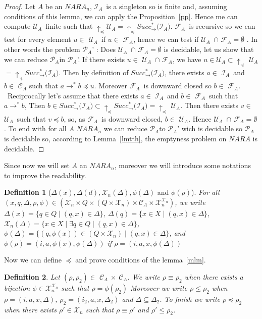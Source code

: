 \documentclass[a4paper,10pt]{report}
\newtheorem{df}{Definition}
\newcommand{\C}{\mathcal{C}_{A}}
\newcommand{\I}{$\mathcal{I}_{A}$}
\newcommand{\F}{$\mathcal{F}_{A}$}
\newcommand{\U}{$\mathcal{U}_{A}$}
\newcommand{\X}{\mathcal{X}_{n}}
\newcommand{\pb}{$\mathcal{P}_{A}$}
\begin{document}
\begin{proof}
  Let $A$ be an $NARA_n$,
  \I\ is a singleton so is finite and, assuming conditions of this lemma, we can apply the Proposition~\ref{pp}.
  Hence me can compute \U\ finite such that $\uparrow_\preceq $\U$=\uparrow_\preceq Succ^*_\rightarrow ($\I$)$.
  \F\ is recursive so we can test for every element $u \in$ \U\ if $u \in$ \F, hence we can test if \U\ $\cap$ \F $=\emptyset$ . 
  In other words the problem \pb' : Does \U\ $\cap$ \F $=\emptyset$ is decidable, let us show that we can reduce \pb in \pb'.  
  If there exists $u \in$ \U\ $\cap$ \F , we have $u\in$\U $\subset \uparrow_\preceq $ \U $=\uparrow_\preceq Succ^*_\rightarrow ($\I$)$. 
  Then by definition of $Succ^*_\rightarrow ($\I$)$, there exists $a\in$ \I\ and $b \in$ $\C$ such that $a \rightarrow^* b \preceq u$.
  Moreover \F\ is downward closed so $b \in $ \F.\\\
  Reciprocally let's assume that there exists $a\in$ \I\ and $b \in$ \F\ such that $a \rightarrow^* b $,
  Then $b \in  Succ^*_\rightarrow ($\I$) \subset \uparrow_\preceq Succ^*_\rightarrow ($\I$)=\uparrow_\preceq $ \U. 
  Then there exists $v \in$ \U\ such that $v \preceq b$, so, as \F\ is downward closed, $b \in$ \U. Hence \U\ $\cap$ \F $=\emptyset$.
  To end with for all $A$ $NARA_n$ we can reduce \pb to \pb' wich is decidable so \pb is decidable so, according to Lemma~\ref{lmtth},  the emptyness problem on $NARA$ is decidable.
\end{proof}

Since now we will set $A$ an $NARA_n$, moreover we will introduce some notations to improve the readability.

\begin{df}[$\Delta(x), \Delta(d),\X(\Delta), \phi(\Delta)$ and $ \phi(\rho)$]
For all $(x,q,\Delta,\rho,\phi) \in (\X \times Q \times (Q \times \X) \times \C \times \X^{\X})$, we write 
$\Delta(x) = \{ q\in Q \mid (q,x) \in \Delta \}$,
$\Delta(q) = \{ x\in X \mid (q,x) \in \Delta \}$,
$\X(\Delta) = \{ x\in X \mid \exists q\in Q \mid (q,x) \in \Delta \}$,
$\phi(\Delta) = \{ (q,\phi(x)) \in (Q \times \X) \mid (q,x) \in \Delta \}$,
and $\phi(\rho) = (i,a,\phi(x),\phi(\Delta))$ if $\rho = (i,a,x,\phi(\Delta))$
\end{df}

Now we can define $\preceq$ and prove conditions of the lemma~\ref{mlm}.

\begin{df}
  Let $(\rho,\rho_2) \in$  $\C$ $\times$ $\C$.
  We write $\rho \equiv \rho_2$ when there exists a bijection $\phi \in \X^{\X}$ such that $\rho = \phi(\rho_2)$  
  Moreover we write $\rho \leq \rho_2$ when $ \rho=( i,a ,x, \Delta  )$, $\rho_2=( i_2,a ,x, \Delta_2  )$ and $\Delta \subseteq \Delta_2$.
  To finish we write $\rho \preceq \rho_2$ when there exists $\rho' \in \X$ such that $\rho \equiv \rho'$ and $\rho' \leq \rho_2$.
\end{df}
\end{document}
